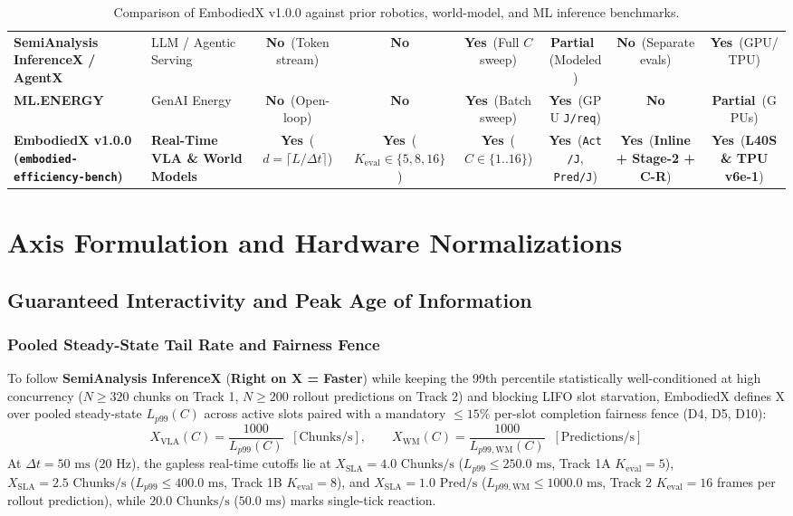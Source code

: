 \documentclass[10pt,letterpaper]{article}
\newcommand{\cmark}{\textcolor{goodgreen}{\textbf{Yes}}}
\newcommand{\wmark}{\textcolor{warnamber}{\textbf{Partial}}}
\newcommand{\xmark}{\textcolor{badred}{\textbf{No}}}
\begin{document}
\begin{table}[ht!]
{\begin{tabular}{l l c c c c c c}
\textbf{SemiAnalysis InferenceX / AgentX \cite{Patel2025inferencemax,Patel2026inferencexv2,Patel2026agentx}} & LLM / Agentic Serving & \xmark\ (Token stream) & \xmark & \cmark\ (Full $C$ sweep) & \wmark\ (Modeled) & \xmark\ (Separate evals) & \cmark\ (GPU/TPU) \\
\textbf{ML.ENERGY \cite{Chung2025mlenergy}} & GenAI Energy & \xmark\ (Open-loop) & \xmark & \cmark\ (Batch sweep) & \cmark\ (GPU \texttt{J/req}) & \xmark & \wmark\ (GPUs) \\
\midrule
\textbf{EmbodiedX v1.0.0 (\texttt{embodied-efficiency-bench})} & \textbf{Real-Time VLA \& World Models} & \cmark\ ($d = \lceil L/\Delta t \rceil$) & \cmark\ ($K_{\text{eval}}\in\{5,8,16\}$) & \cmark\ ($C \in \{1..16\}$) & \cmark\ (\texttt{Act/J}, \texttt{Pred/J}) & \cmark\ (\textbf{Inline + Stage-2 + C-R}) & \cmark\ (\textbf{L40S \& TPU v6e-1}) \\
\bottomrule
\end{tabular}%
}
\caption{Comparison of EmbodiedX v1.0.0 against prior robotics, world-model, and ML inference benchmarks.}
\end{table}

\section{Axis Formulation and Hardware Normalizations}

\subsection{Guaranteed Interactivity and Peak Age of Information}

\subsubsection{Pooled Steady-State Tail Rate and Fairness Fence}
To follow \textbf{SemiAnalysis InferenceX} \cite{Patel2025inferencemax,Patel2026inferencexv2} (\textbf{Right on X = Faster}) while keeping the 99th percentile statistically well-conditioned at high concurrency ($N \ge 320$ chunks on Track 1, $N \ge 200$ rollout predictions on Track 2) and blocking LIFO slot starvation, EmbodiedX defines X over pooled steady-state $L_{p99}(C)$ across active slots paired with a mandatory $\le 15\%$ per-slot completion fairness fence (D4, D5, D10):
\begin{equation}
    X_{\text{VLA}}(C) = \frac{1000}{L_{p99}(C)} \;\; [\text{Chunks/s}], \qquad X_{\text{WM}}(C) = \frac{1000}{L_{p99,\text{WM}}(C)} \;\; [\text{Predictions/s}]
\end{equation}
At $\Delta t = 50\text{ ms}$ ($20\text{ Hz}$), the gapless real-time cutoffs lie at $X_{\text{SLA}} = 4.0\text{ Chunks/s}$ ($L_{p99} \le 250.0\text{ ms}$, Track 1A $K_{\text{eval}} = 5$), $X_{\text{SLA}} = 2.5\text{ Chunks/s}$ ($L_{p99} \le 400.0\text{ ms}$, Track 1B $K_{\text{eval}} = 8$), and $X_{\text{SLA}} = 1.0\text{ Pred/s}$ ($L_{p99,\text{WM}} \le 1000.0\text{ ms}$, Track 2 $K_{\text{eval}} = 16$ frames per rollout prediction), while $20.0\text{ Chunks/s}$ ($50.0\text{ ms}$) marks single-tick reaction.
\end{document}
